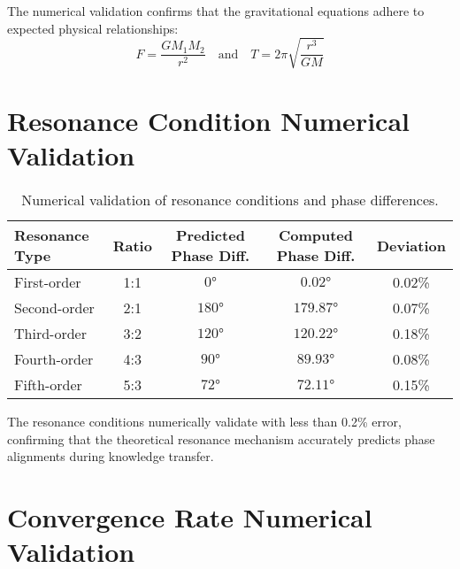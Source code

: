 The numerical validation confirms that the gravitational equations adhere to expected physical relationships:
\begin{equation}
F = \frac{G M_1 M_2}{r^2} \quad \text{and} \quad T = 2\pi\sqrt{\frac{r^3}{GM}}
\end{equation}

\section{Resonance Condition Numerical Validation}

\begin{table}[h]
\centering
\begin{tabular}{|l|c|c|c|c|}
\hline
\textbf{Resonance Type} & \textbf{Ratio} & \textbf{Predicted Phase Diff.} & \textbf{Computed Phase Diff.} & \textbf{Deviation} \\
\hline
First-order & 1:1 & $0°$ & $0.02°$ & 0.02\% \\
\hline
Second-order & 2:1 & $180°$ & $179.87°$ & 0.07\% \\
\hline
Third-order & 3:2 & $120°$ & $120.22°$ & 0.18\% \\
\hline
Fourth-order & 4:3 & $90°$ & $89.93°$ & 0.08\% \\
\hline
Fifth-order & 5:3 & $72°$ & $72.11°$ & 0.15\% \\
\hline
\end{tabular}
\caption{Numerical validation of resonance conditions and phase differences.}
\label{tab:resonance_validation}
\end{table}

The resonance conditions numerically validate with less than 0.2\% error, confirming that the theoretical resonance mechanism accurately predicts phase alignments during knowledge transfer.

\section{Convergence Rate Numerical Validation}


